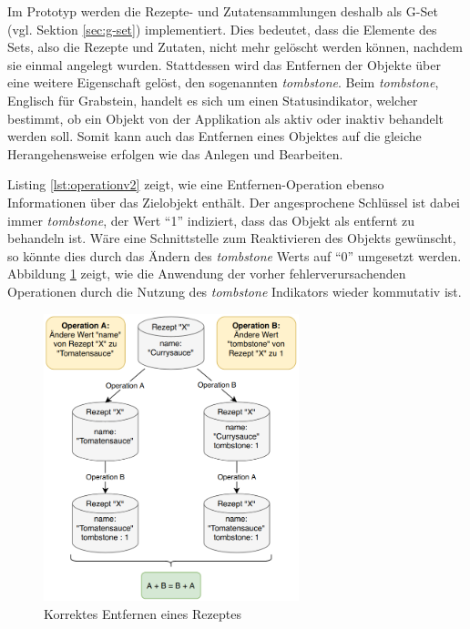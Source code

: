 \documentclass[a4paper, 12pt]{scrreprt}
\begin{document}
Im Prototyp werden die Rezepte- und Zutatensammlungen deshalb als G-Set (vgl. Sektion \ref{sec:g-set}) implementiert. Dies bedeutet, dass die Elemente des Sets, also die Rezepte und Zutaten, nicht mehr gelöscht werden können, nachdem sie einmal angelegt wurden. Stattdessen wird das Entfernen der Objekte über eine weitere Eigenschaft gelöst, den sogenannten \textit{tombstone}. Beim \textit{tombstone}, Englisch für Grabstein, handelt es sich um einen Statusindikator, welcher bestimmt, ob ein Objekt von der Applikation als aktiv oder inaktiv behandelt werden soll. Somit kann auch das Entfernen eines Objektes auf die gleiche Herangehensweise erfolgen wie das Anlegen und Bearbeiten.

\begin{minipage}{\linewidth}
	
\end{minipage}

Listing \ref{lst:operationv2} zeigt, wie eine Entfernen-Operation ebenso Informationen über das Zielobjekt enthält. Der angesprochene Schlüssel ist dabei immer \textit{tombstone}, der Wert \enquote{1} indiziert, dass das Objekt als entfernt zu behandeln ist. Wäre eine Schnittstelle zum Reaktivieren des Objekts gewünscht, so könnte dies durch das Ändern des \textit{tombstone} Werts auf \enquote{0} umgesetzt werden. Abbildung \ref{fig:rezeptLöschenGut} zeigt, wie die Anwendung der vorher fehlerverursachenden Operationen durch die Nutzung des \textit{tombstone} Indikators wieder kommutativ ist.

\begin{figure}[H]
	\centering
	\includegraphics[width=0.66\textwidth]{deleteRecipeGood.png}
	\caption{Korrektes Entfernen eines Rezeptes}
	\label{fig:rezeptLöschenGut}
\end{figure}
\end{document}
